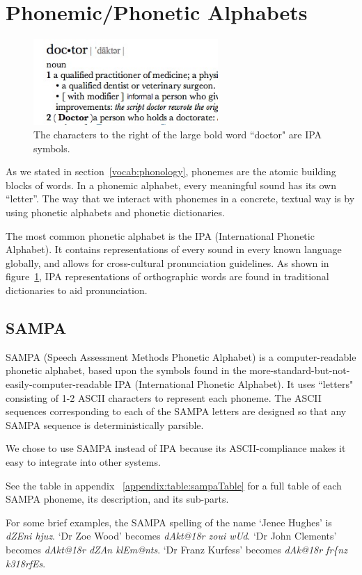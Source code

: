 
\FloatBarrier

\section{Phonemic/Phonetic Alphabets}
\label{section:phonemicAlphabets}
\begin{figure}
\begin{center}
\includegraphics[width=70mm]{doctorDictIPAScreenshot.jpg}
\captionfonts
\caption[Dictionary IPA screenshot]{ The characters to the right of the large bold word ``doctor" are IPA symbols. }
\label{fig:doctorDictIPAScreenshot}
\end{center}
\end{figure}

As we stated in section~\ref{vocab:phonology}, phonemes are the atomic building blocks of words. In a phonemic alphabet, every meaningful sound has its own ``letter''.  The way that we interact with phonemes in a concrete, textual way is by using phonetic alphabets and phonetic dictionaries.  

The most common phonetic alphabet is the IPA (International Phonetic Alphabet). It contains representations of every sound in every known language globally, and allows for cross-cultural pronunciation guidelines.  As shown in figure~\ref{fig:doctorDictIPAScreenshot}, IPA representations of orthographic words are found in traditional dictionaries to aid pronunciation. 

\subsection{SAMPA}
\label{section:sampaAlphabet}

SAMPA (Speech Assessment Methods Phonetic Alphabet) is a computer-readable phonetic alphabet, based upon the symbols found in the more-standard-but-not-easily-computer-readable  IPA (International Phonetic Alphabet).  
It uses ``letters" consisting of 1-2 ASCII characters to represent each phoneme. The ASCII sequences corresponding to each of the SAMPA letters are designed so that any SAMPA sequence is deterministically parsible.

We chose to use SAMPA instead of IPA because its ASCII-compliance makes it easy to integrate into other systems.

See the table in appendix ~\ref{appendix:table:sampaTable} for a full table of each SAMPA phoneme, its description, and its sub-parts.

For some brief examples, the SAMPA spelling of the name `Jenee Hughes' is \emph{dZEni hjuz}.  
`Dr Zoe Wood'  becomes \emph{dAkt@\char18r zoui wUd}.  
`Dr John Clements' becomes \emph{dAkt@\char18r dZAn klEm@nts}. 
`Dr Franz Kurfess' becomes \emph{dAk@\char18r fr\{nz k3\char18rfEs}.

